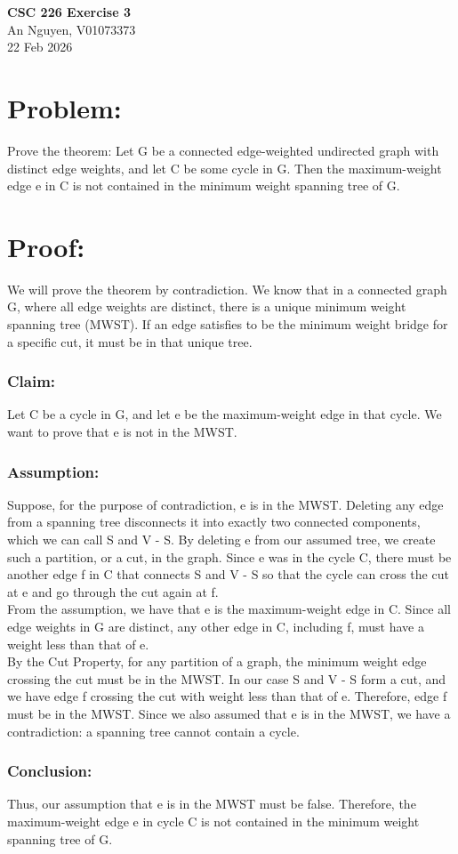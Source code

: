 \documentclass[12pt, b5paper]{article}
\begin{document}
\begin{center}
{\bf CSC 226
Exercise 3}\\
An Nguyen, V01073373\\
22 Feb 2026
\end{center}

\section*{Problem:}
Prove the theorem: Let G be a connected edge-weighted undirected graph with distinct edge weights, 
and let C be some cycle in G. Then the maximum-weight edge e in C is not contained in the 
minimum weight spanning tree of G.

\section*{Proof:}
We will prove the theorem by contradiction. We know that in a connected graph G, where all edge weights are distinct, there is 
a unique minimum weight spanning tree (MWST). If an edge satisfies to be the minimum 
weight bridge for a specific cut, it must be in that unique tree.
\subsubsection*{Claim:} 
Let C be a cycle in G, and let e be the maximum-weight edge in that cycle. 
We want to prove that e is not in the MWST.
\subsubsection*{Assumption:} 
Suppose, for the purpose of contradiction, e is in the MWST. Deleting any edge from a spanning tree disconnects it into exactly 
two connected components, which we can call S and V - S. By deleting e from our assumed tree, 
we create such a partition, or a cut, in the graph.
Since e was in the cycle C, there must be another edge f in C that connects S and V - S so that the
cycle can cross the cut at e and go through the cut again at f.\\
\newline
From the assumption, we have that e is the maximum-weight edge in C. Since all edge weights in G
 are distinct, any other edge in C, including f, must have a weight less than that of e.\\
\newline
By the Cut Property, for any partition of a graph, the minimum weight edge crossing 
the cut must be in the MWST. In our case S and V - S form a cut, and we have edge f 
crossing the cut with weight less than that of e. Therefore, edge f must be in the MWST. Since 
we also assumed that e is in the MWST, we have a contradiction: a spanning tree cannot contain a cycle.
\subsubsection*{Conclusion:}
Thus, our assumption that e is in the MWST must be false. Therefore, the maximum-weight edge e 
in cycle C is not contained in the minimum weight spanning tree of G.\\
\end{document}
